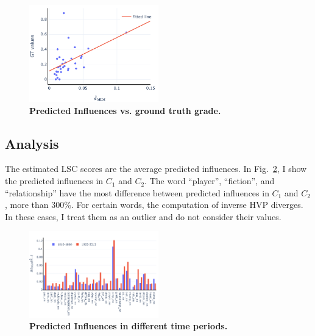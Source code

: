 \begin{figure}[t]
\centering
\includegraphics[width=0.5\textwidth]{../project/src/influences_grade_scatter.pdf}
\caption{\textbf{Predicted Influences vs. ground truth grade.}}
\label{fig:rank}
\end{figure}




\subsection{Analysis}
The estimated LSC scores are the average predicted influences. 
In Fig.~\ref{fig:inf_time}, I show the predicted influences in $C_1$ and $C_2$. 
The word ``player'', ``fiction'', and ``relationship'' have the most difference between predicted influences in $C_1$ and $C_2$, more than 300\%.
For certain words, the computation of inverse HVP diverges. In these cases, I treat them as an outlier and do not consider their values.


\begin{figure}[t]
\centering
\includegraphics[width=0.5\textwidth]{../project/src/influences_by_corpus.pdf}
\caption{\textbf{Predicted Influences in different time periods.}}
\label{fig:inf_time}
\end{figure}
